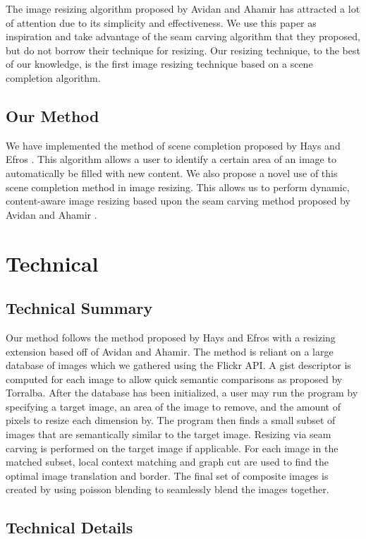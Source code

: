 \documentclass[11pt]{amsart}
\begin{document}
The image resizing algorithm proposed by Avidan and Ahamir has attracted a lot of attention due
to its simplicity and effectiveness. We use this paper as inspiration and take advantage of the seam carving algorithm that they proposed, but do not borrow their technique for resizing. Our resizing technique, to the best of our knowledge, is the first image resizing technique based on a scene
completion algorithm.

\subsection{Our Method}

We have implemented the method of scene completion proposed by Hays and Efros \cite{Hays:2007}. This algorithm allows a user to identify a certain area of an image to automatically be filled with new content. We also propose a novel use of this scene completion method in image resizing. This allows us to perform dynamic, content-aware image resizing based upon the seam carving method proposed by Avidan and Ahamir \cite{Avidan:2007}.

\section{Technical}

\subsection{Technical Summary}
Our method follows the method proposed by Hays and Efros\cite{Hays:2007} with a resizing extension based off of Avidan and Ahamir. \cite{Avidan:2007} The method is reliant on a large database of images which we gathered using the Flickr API. A gist descriptor is computed for each image to allow quick semantic comparisons as proposed by Torralba. \cite{Torralba:2006} After the database has been initialized, a user may run the program by specifying a target image, an area of the image to remove, and the amount of pixels to resize each dimension by. The program then finds a small subset of images that are semantically similar to the target image. Resizing via seam carving is performed on the target image if applicable. For each image in the matched subset, local context matching and graph cut are used to find the optimal image translation and border. The final set of composite images is created by using poisson blending to seamlessly blend the images together.

\subsection{Technical Details}
\end{document}
